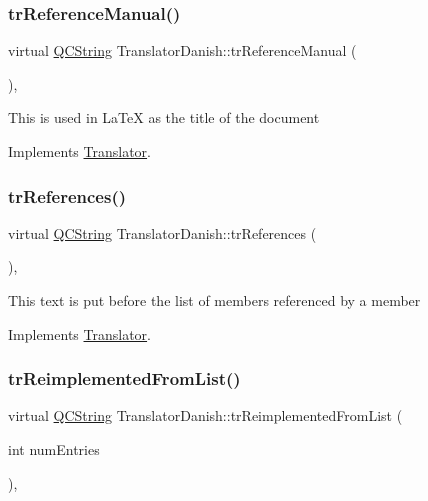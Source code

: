 \subsubsection{\texorpdfstring{trReferenceManual()}{trReferenceManual()}}
{\footnotesize\ttfamily virtual \mbox{\hyperlink{class_q_c_string}{Q\+C\+String}} Translator\+Danish\+::tr\+Reference\+Manual (\begin{DoxyParamCaption}{ }\end{DoxyParamCaption})\hspace{0.3cm}{\ttfamily [inline]}, {\ttfamily [virtual]}}

This is used in La\+TeX as the title of the document 

Implements \mbox{\hyperlink{class_translator}{Translator}}.

\mbox{\label{class_translator_danish_aef4dbb56629664fccd583460f9193fe5}} 
\subsubsection{\texorpdfstring{trReferences()}{trReferences()}}
{\footnotesize\ttfamily virtual \mbox{\hyperlink{class_q_c_string}{Q\+C\+String}} Translator\+Danish\+::tr\+References (\begin{DoxyParamCaption}{ }\end{DoxyParamCaption})\hspace{0.3cm}{\ttfamily [inline]}, {\ttfamily [virtual]}}

This text is put before the list of members referenced by a member 

Implements \mbox{\hyperlink{class_translator}{Translator}}.

\mbox{\label{class_translator_danish_a91a3f0362c99e788b5ddea3fbecdcab1}} 
\subsubsection{\texorpdfstring{trReimplementedFromList()}{trReimplementedFromList()}}
{\footnotesize\ttfamily virtual \mbox{\hyperlink{class_q_c_string}{Q\+C\+String}} Translator\+Danish\+::tr\+Reimplemented\+From\+List (\begin{DoxyParamCaption}\item[{int}]{num\+Entries }\end{DoxyParamCaption})\hspace{0.3cm}{\ttfamily [inline]}, {\ttfamily [virtual]}}

